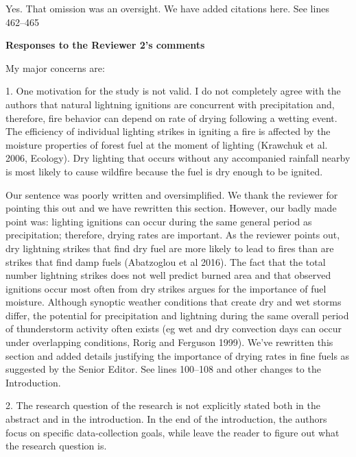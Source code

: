 \documentclass[letterpaper, 12pt]{letter}
\begin{document}
\begin{letter}{}
Yes. That omission was an oversight. We have added citations here. See lines
462--465

{\bf Responses to the Reviewer 2's comments}

\begin{quoting}

  My major concerns are:
  
  1. One motivation for the study is not valid. I do not completely agree with
  the authors that natural lightning ignitions are concurrent with
  precipitation and, therefore, fire behavior can depend on rate of drying
  following a wetting event. The efficiency of individual lighting strikes in
  igniting a fire is affected by the moisture properties of forest fuel at the
  moment of lighting (Krawchuk et al. 2006, Ecology). Dry lighting that occurs
  without any accompanied rainfall nearby is most likely to cause wildfire
  because the fuel is dry enough to be ignited.
\end{quoting}

Our sentence was poorly written and oversimplified. We thank the reviewer for
pointing this out and we have rewritten this section. However, our badly made
point was: lighting ignitions can occur during the same general period as
precipitation; therefore, drying rates are important. As the reviewer points
out, dry lightning strikes that find dry fuel are more likely to lead to fires
than are strikes that find damp fuels (Abatzoglou et al 2016). The fact that
the total number lightning strikes does not well predict burned area and that
observed ignitions occur most often from dry strikes argues for the importance
of fuel moisture. Although synoptic weather conditions that create dry and wet
storms differ, the potential for precipitation and lightning during the same
overall period of thunderstorm activity often exists (eg wet and dry convection
days can occur under overlapping conditions, Rorig and Ferguson 1999). We've
rewritten this section and added details justifying the importance of drying
rates in fine fuels as suggested by the Senior Editor. See lines 100--108 and
other changes to the Introduction.

\begin{quoting}
  2. The research question of the research is not explicitly stated both in the
  abstract and in the introduction. In the end of the introduction, the authors
  focus on specific data-collection goals, while leave the reader to figure out
  what the research question is.
\end{quoting}


\end{letter}
\end{document}
